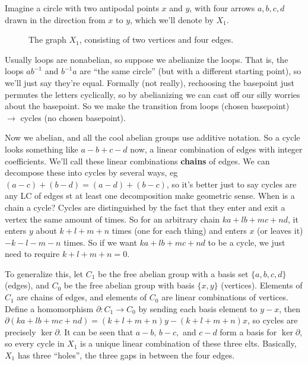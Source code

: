 Imagine a circle with two antipodal points $x$ and $y$, with four arrows $a,b,c,d$ drawn in the direction from $x$ to $y$, which we'll denote by $X_1$.
\begin{figure}[H]
    \centering
    \caption{The graph $X_1$, consisting of two vertices and four edges.}
    \label{x1}
\end{figure}
Usually loops are nonabelian, so suppose we abelianize the loops. That is, the loops $ab^{-1}$ and $b^{-1}a$ are ``the same circle'' (but with a different starting point), so we'll just say they're equal. Formally (not really), rechoosing the basepoint just permutes the letters cyclically, so by abelianizing we can cast off our silly worries about the basepoint. So we make the transition from loops (chosen basepoint) $\longrightarrow$ cycles (no chosen basepoint).

Now we abelian, and all the cool abelian groups use additive notation. So a cycle looks something like $a-b+c-d$ now, a linear combination of edges with integer coefficients. We'll call these linear combinations \textbf{chains} of edges. We can decompose these into cycles by several ways, eg $(a-c)+(b-d)=(a-d)+(b-c)$, so it's better just to say cycles are any LC of edges st at least one decomposition make geometric sense. When is a chain a cycle? Cycles are distinguished by the fact that they enter and exit a vertex the same amount of times. So for an arbitrary chain $ka+lb+mc+nd$, it enters $y$ about $k+l+m+n$ times (one for each thing) and enters $x$ (or leaves it) $-k-l-m-n$ times. So if we want $ka+lb+mc+nd$ to be a cycle, we just need to require $k+l+m+n=0$.

To generalize this, let $C_1$ be the free abelian group with a basis set $\{a,b,c,d\} $ (edges), and $C_0$ be the free abelian group with basis $\{x,y\} $ (vertices). Elements of $C_1$ are chains of edges, and elements of  $C_0$ are linear combinations of vertices. Define a homomorphism $\partial \colon C_1 \to C_0$ by sending each basis element to $y-x$, then $\partial (ka+lb+mc+nd)=(k+l+m+n)y-(k+l+m+n)x$, so cycles are precisely $\operatorname{ker}\partial $. It can be seen that $a-b,\,b-c,$ and $c-d$ form a basis for $\operatorname{ker}\partial $, so every cycle in $X_1$ is a unique linear combination of these three elts. Basically, $X_1$ has three ``holes'', the three gaps in between the four edges.

